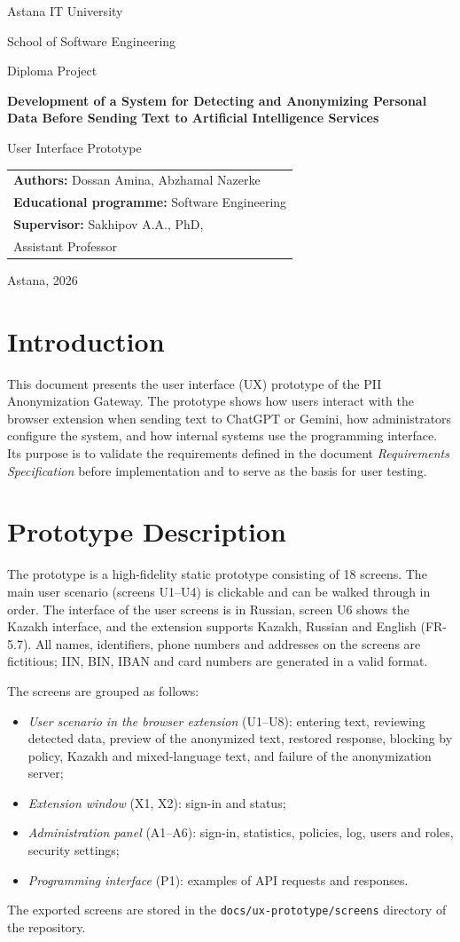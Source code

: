 \documentclass[12pt,a4paper]{article}
\makeatletter
\newcommand{\maketitlepage}[1]{%
\begin{titlepage}
\centering
{\large Astana IT University\par}
{\normalsize School of Software Engineering\par}
\vspace{4.5cm}
{\normalsize Diploma Project\par}
\vspace{0.6cm}
{\Large\bfseries Development of a System for Detecting and Anonymizing Personal Data Before Sending Text to Artificial Intelligence Services\par}
\vspace{1.2cm}
{\LARGE #1\par}
\vfill
\begin{flushright}
\begin{tabular}{@{}l@{}}
\textbf{Authors:} Dossan Amina, Abzhamal Nazerke\\
\textbf{Educational programme:} Software Engineering\\
\textbf{Supervisor:} Sakhipov A.A., PhD,\\ \hspace{2.2cm}Assistant Professor
\end{tabular}
\end{flushright}
\vspace{2.5cm}
{\normalsize Astana, 2026\par}
\end{titlepage}
\setcounter{page}{2}}
\makeatother
\begin{document}
\maketitlepage{User Interface Prototype}

\tableofcontents
\newpage

\section{Introduction}

This document presents the user interface (UX) prototype of the PII Anonymization Gateway. The prototype shows how users interact with the browser extension when sending text to ChatGPT or Gemini, how administrators configure the system, and how internal systems use the programming interface. Its purpose is to validate the requirements defined in the document \emph{Requirements Specification} before implementation and to serve as the basis for user testing.

\section{Prototype Description}

The prototype is a high-fidelity static prototype consisting of 18 screens. The main user scenario (screens U1--U4) is clickable and can be walked through in order. The interface of the user screens is in Russian, screen U6 shows the Kazakh interface, and the extension supports Kazakh, Russian and English (FR-5.7). All names, identifiers, phone numbers and addresses on the screens are fictitious; IIN, BIN, IBAN and card numbers are generated in a valid format.

The screens are grouped as follows:
\begin{itemize}
\item \emph{User scenario in the browser extension} (U1--U8): entering text, reviewing detected data, preview of the anonymized text, restored response, blocking by policy, Kazakh and mixed-language text, and failure of the anonymization server;
\item \emph{Extension window} (X1, X2): sign-in and status;
\item \emph{Administration panel} (A1--A6): sign-in, statistics, policies, log, users and roles, security settings;
\item \emph{Programming interface} (P1): examples of API requests and responses.
\end{itemize}

The exported screens are stored in the \texttt{docs/ux-prototype/screens} directory of the repository.
\end{document}
